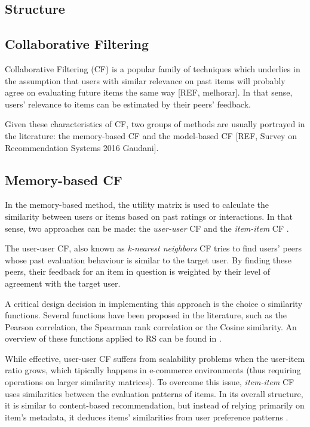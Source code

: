 \subsection{Structure}

\subsection{Collaborative Filtering}

    Collaborative Filtering (CF) is a popular family of techniques which underlies in the assumption 
    that users with similar relevance on past items will probably agree on evaluating future items 
    the same way [REF, melhorar]. In that sense, users' relevance to items can be estimated by their
    peers' feedback.

    Given these characteristics of CF, two groups of methods are usually portrayed in the literature: 
    the memory-based CF and the model-based CF [REF, Survey on Recommendation Systems 2016 Gaudani]. 

  \subsection{Memory-based CF}

    In the memory-based method, the utility matrix is used to calculate the similarity between 
    users or items based on past ratings or interactions. In that sense, two approaches can be made:
    the \textit{user-user} CF and the \textit{item-item} CF \cite{2011ekstrand}. 
    
    The user-user CF, also known as \textit{k-nearest neighbors} CF tries to find users' peers 
    whose past evaluation behaviour is similar to the target user. By finding these peers, their 
    feedback for an item in question is weighted by their level of agreement with the target user.  
    
    A critical design decision in implementing this approach is the choice o similarity functions. 
    Several functions have been proposed in the literature, such as the Pearson correlation, the 
    Spearman rank correlation or the Cosine similarity. An overview of these functions applied to RS
    can be found in \cite{2011ekstrand}.
    
    While effective, user-user CF suffers from scalability problems when the user-item ratio grows, which
    tipically happens in e-commerce environments (thus requiring operations on larger similarity matrices).
    To overcome this issue, \textit{item-item} CF uses similarities between the evaluation patterns 
    of items. In its overall structure, it is similar to content-based recommendation, but instead of 
    relying primarily on item's metadata, it deduces items' similarities from user preference patterns \cite{2001sarwar}.

